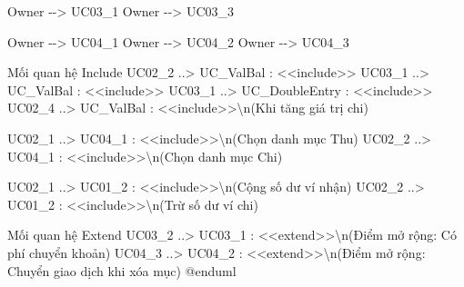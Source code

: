 \documentclass[11pt,a4paper]{article}
\newenvironment{Shaded}{}{}
\newcommand{\NormalTok}[1]{#1}
\begin{document}
\begin{Shaded}
\begin{Highlighting}[]
\NormalTok{Owner {-}{-}\textgreater{} UC03\_1}
\NormalTok{Owner {-}{-}\textgreater{} UC03\_3}

\NormalTok{Owner {-}{-}\textgreater{} UC04\_1}
\NormalTok{Owner {-}{-}\textgreater{} UC04\_2}
\NormalTok{Owner {-}{-}\textgreater{} UC04\_3}

\NormalTok{\textquotesingle{} Mối quan hệ Include}
\NormalTok{UC02\_2 ..\textgreater{} UC\_ValBal : \textless{}\textless{}include\textgreater{}\textgreater{}}
\NormalTok{UC03\_1 ..\textgreater{} UC\_ValBal : \textless{}\textless{}include\textgreater{}\textgreater{}}
\NormalTok{UC03\_1 ..\textgreater{} UC\_DoubleEntry : \textless{}\textless{}include\textgreater{}\textgreater{}}
\NormalTok{UC02\_4 ..\textgreater{} UC\_ValBal : \textless{}\textless{}include\textgreater{}\textgreater{}\textbackslash{}n(Khi tăng giá trị chi)}

\NormalTok{UC02\_1 ..\textgreater{} UC04\_1 : \textless{}\textless{}include\textgreater{}\textgreater{}\textbackslash{}n(Chọn danh mục Thu)}
\NormalTok{UC02\_2 ..\textgreater{} UC04\_1 : \textless{}\textless{}include\textgreater{}\textgreater{}\textbackslash{}n(Chọn danh mục Chi)}

\NormalTok{UC02\_1 ..\textgreater{} UC01\_2 : \textless{}\textless{}include\textgreater{}\textgreater{}\textbackslash{}n(Cộng số dư ví nhận)}
\NormalTok{UC02\_2 ..\textgreater{} UC01\_2 : \textless{}\textless{}include\textgreater{}\textgreater{}\textbackslash{}n(Trừ số dư ví chi)}

\NormalTok{\textquotesingle{} Mối quan hệ Extend}
\NormalTok{UC03\_2 ..\textgreater{} UC03\_1 : \textless{}\textless{}extend\textgreater{}\textgreater{}\textbackslash{}n(Điểm mở rộng: Có phí chuyển khoản)}
\NormalTok{UC04\_3 ..\textgreater{} UC04\_2 : \textless{}\textless{}extend\textgreater{}\textgreater{}\textbackslash{}n(Điểm mở rộng: Chuyển giao dịch khi xóa mục)}
\NormalTok{@enduml}
\end{Highlighting}
\end{Shaded}
\fi
\end{document}
